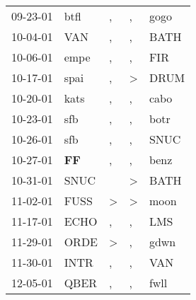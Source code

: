 \begin{supertabular}{p{0.07\textwidth}p{0.06\textwidth}p{0.02\textwidth}p{0.02\textwidth}p{0.06\textwidth}}
          09-23-01\textsuperscript{} &           btfl\textsuperscript{} &                , &                , &           gogo\textsuperscript{} \\
          10-04-01\textsuperscript{} &            VAN\textsuperscript{} &                , &                , &           BATH\textsuperscript{} \\
          10-06-01\textsuperscript{} &           empe\textsuperscript{} &                , &                , &            FIR\textsuperscript{} \\
          10-17-01\textsuperscript{} &           spai\textsuperscript{} &                , &     \textgreater &           DRUM\textsuperscript{} \\
          10-20-01\textsuperscript{} &           kats\textsuperscript{} &                , &                , &           cabo\textsuperscript{} \\
          10-23-01\textsuperscript{} &            sfb\textsuperscript{} &                , &                , &           botr\textsuperscript{} \\
          10-26-01\textsuperscript{} &            sfb\textsuperscript{} &                , &                , &           SNUC\textsuperscript{} \\
          10-27-01\textsuperscript{} &    \textbf{FF\textsuperscript{}} &                , &                , &           benz\textsuperscript{} \\
          10-31-01\textsuperscript{} &           SNUC\textsuperscript{} &                  &     \textgreater &           BATH\textsuperscript{} \\
          11-02-01\textsuperscript{} &           FUSS\textsuperscript{} &     \textgreater &     \textgreater &           moon\textsuperscript{} \\
          11-17-01\textsuperscript{} &           ECHO\textsuperscript{} &                , &                , &            LMS\textsuperscript{} \\
          11-29-01\textsuperscript{} &           ORDE\textsuperscript{} &     \textgreater &                , &           gdwn\textsuperscript{} \\
          11-30-01\textsuperscript{} &           INTR\textsuperscript{} &                , &                , &            VAN\textsuperscript{} \\
          12-05-01\textsuperscript{} &           QBER\textsuperscript{} &                , &                , &           fwll\textsuperscript{} \\

\end{supertabular}
